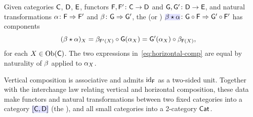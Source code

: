 \documentclass[../preamble]{subfiles}
\begin{document}
\begin{definition}
  \label{def:horizontal-composition}
  Given categories $\mathsf{C}$, $\mathsf{D}$, $\mathsf{E}$,
  functors $\Functor{F}, \Functor{F}' \colon \Category{C} \lto \Category{D}$
  and $\Functor{G}, \Functor{G}' \colon \Category{D} \lto \Category{E}$,
  and natural transformations
  $\mathsf{\alpha} \colon \mathsf{F} \Rightarrow \mathsf{F}'$
  and $\mathsf{\beta} \colon \mathsf{G} \Rightarrow \mathsf{G}'$,
  the  (or )
  $\newmath{\NatTrans{\beta} \star \NatTrans{\alpha}}
    \colon \Functor{G} \circ \Functor{F} \Rightarrow \Functor{G}' \circ \Functor{F}'$
  has components
  \begin{equation}
    \label{eq:horizontal-comp}
    (\mathsf{\beta} \star \mathsf{\alpha})_X
    = \mathsf{\beta}_{\mathsf{F}'(X)} \circ \mathsf{G}(\mathsf{\alpha}_X)
    = \mathsf{G}'(\mathsf{\alpha}_X) \circ \mathsf{\beta}_{\mathsf{F}(X)},
  \end{equation}
  for each $X \in \operatorname{Ob}(\mathsf{C})$.
  The two expressions in~\eqref{eq:horizontal-comp} are equal
  by naturality of $\mathsf{\beta}$ applied to $\mathsf{\alpha}_X$.
\end{definition}

\begin{remark}
  Vertical composition is associative and admits $\operatorname{id}_{\mathsf{F}}$
  as a two-sided unit.
  Together with the interchange law
  relating vertical and horizontal composition,
  these data make functors and natural transformations
  between two fixed categories into a category
  $\newmath{[\Category{C}, \Category{D}]}$
  (the ),
  and all small categories into a 2-category $\mathsf{Cat}$.
\end{remark}
\end{document}
